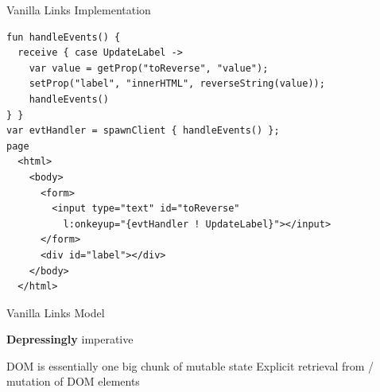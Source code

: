 \documentclass[11.5pt, aspectratio=169]{beamer}
\begin{document}
\begin{frame}[fragile]{Vanilla Links Implementation}

  \vspace{-0.5em}
  \begin{lstlisting}[language=links]
fun handleEvents() {
  receive { case UpdateLabel ->
    var value = getProp("toReverse", "value");
    setProp("label", "innerHTML", reverseString(value));
    handleEvents()
} }
var evtHandler = spawnClient { handleEvents() };
page
  <html>
    <body>
      <form>
        <input type="text" id="toReverse"
          l:onkeyup="{evtHandler ! UpdateLabel}"></input>
      </form>
      <div id="label"></div>
    </body>
  </html>
  \end{lstlisting}
\end{frame}

\begin{frame}{Vanilla Links Model}

  \begin{center}
  \end{center}

  \begin{fullpageitemize}
  \itemR \textbf{Depressingly} imperative
    \begin{itemize}
  \itemR DOM is essentially one big chunk of mutable state
  \itemR Explicit retrieval from / mutation of DOM elements
  \end{itemize}
  \end{fullpageitemize}
\end{frame}


\end{document}
